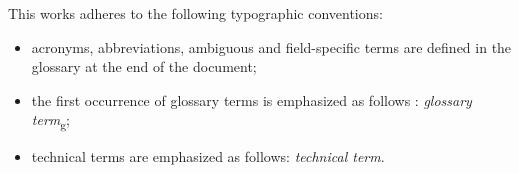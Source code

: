 This works adheres to the following typographic conventions:
\begin{itemize}
	\item acronyms, abbreviations, ambiguous and field-specific terms are defined in the glossary at the end of the document;
	\item the first occurrence of glossary terms is emphasized as follows : \emph{glossary term}\textsubscript{g};
	\item technical terms are emphasized as follows: \emph{technical term}.
\end{itemize}